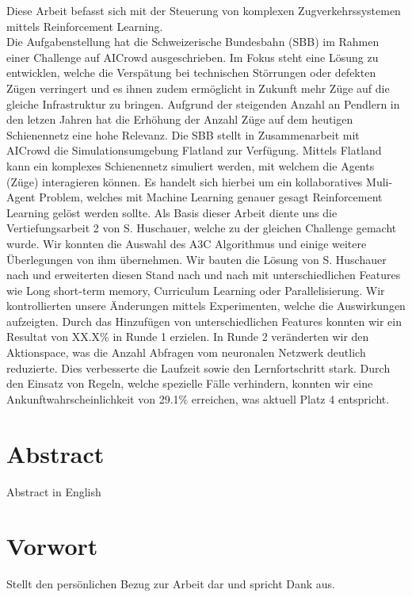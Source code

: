 Diese Arbeit befasst sich mit der Steuerung von komplexen Zugverkehrssystemen mittels Reinforcement Learning.\\
Die Aufgabenstellung hat die Schweizerische Bundesbahn (SBB) im Rahmen einer Challenge auf AICrowd ausgeschrieben.
Im Fokus steht eine Lösung zu entwicklen, welche die Verspätung bei technischen Störrungen oder defekten Zügen verringert und es ihnen zudem ermöglicht in Zukunft mehr Züge auf die gleiche Infrastruktur zu bringen.
Aufgrund der steigenden Anzahl an Pendlern in den letzen Jahren hat die Erhöhung der Anzahl Züge auf dem heutigen Schienennetz eine hohe Relevanz.
Die SBB stellt in Zusammenarbeit mit AICrowd die Simulationsumgebung Flatland zur Verfügung. Mittels Flatland kann ein komplexes Schienennetz simuliert werden, mit welchem die Agents (Züge) interagieren können.
Es handelt sich hierbei um ein kollaboratives Muli-Agent Problem, welches mit Machine Learning genauer gesagt Reinforcement Learning gelöst werden sollte.
Als Basis dieser Arbeit diente uns die Vertiefungsarbeit 2 von S. Huschauer, welche zu der gleichen Challenge gemacht wurde.
Wir konnten die Auswahl des A3C Algorithmus und einige weitere Überlegungen von ihm übernehmen.
Wir bauten die Lösung von S. Huschauer nach und erweiterten diesen Stand nach und nach mit unterschiedlichen Features wie Long short-term memory, Curriculum Learning oder Parallelisierung.
Wir kontrollierten unsere Änderungen mittels Experimenten, welche die Auswirkungen aufzeigten.
Durch das Hinzufügen von unterschiedlichen Features konnten wir ein Resultat von XX.X\% in Runde 1 erzielen.
In Runde 2 veränderten wir den Aktionspace, was die Anzahl Abfragen vom neuronalen Netzwerk deutlich reduzierte. Dies verbesserte die Laufzeit sowie den Lernfortschritt stark.
Durch den Einsatz von Regeln, welche spezielle Fälle verhindern, konnten wir eine Ankunftwahrscheinlichkeit von 29.1\% erreichen, was aktuell Platz 4 entspricht.

\newpage
\thispagestyle{empty}
\chapter*{Abstract}\label{abstract}
Abstract in English


\chapter*{Vorwort}\label{vorwort}
Stellt den persönlichen Bezug zur Arbeit dar und spricht Dank aus.